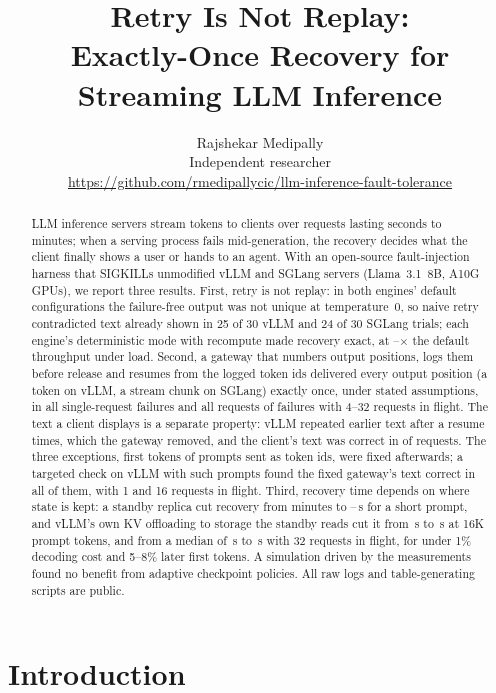 \documentclass[10pt,twocolumn]{article}
\title{Retry Is Not Replay:\\ Exactly-Once Recovery for Streaming LLM Inference}
\author{Rajshekar Medipally\\
\small Independent researcher\\
\small \url{https://github.com/rmedipallycic/llm-inference-fault-tolerance}}
\date{}
\begin{document}
\maketitle
\thispagestyle{fancy}


\begin{abstract}
LLM inference servers stream tokens to clients over requests lasting seconds
to minutes; when a serving process fails mid-generation, the recovery decides
what the client finally shows a user or hands to an agent. With an
open-source fault-injection harness that SIGKILLs unmodified vLLM and SGLang
servers (Llama~3.1~8B, A10G GPUs), we report three results. First, retry is
not replay: in both engines' default configurations the failure-free output
was not unique at temperature~0, so naive retry contradicted text already
shown in 25 of 30 vLLM and 24 of 30 SGLang trials; each engine's
deterministic mode with recompute made recovery exact, at
\TputDetMin--\TputDetMax$\times$ the default throughput under load. Second,
a gateway that numbers output positions, logs them before release and
resumes from the logged token ids delivered every output position (a token
on vLLM, a stream chunk on SGLang) exactly once, under stated assumptions, in all \GwKillTrials{} single-request failures
and all \PccRecords{} requests of failures with 4--32 requests in flight. The
text a client displays is a separate property: vLLM repeated earlier text
after a resume \RevRepeatRemoved{} times, which the gateway removed, and the
client's text was correct in \RevTextOk{} of \RevRecords{} requests. The three
exceptions, first tokens of prompts sent as token ids, were fixed afterwards;
a targeted check on vLLM with \TbPrompts{} such prompts found the fixed
gateway's text correct in all of them, with 1 and 16 requests in flight.
Third, recovery time
depends on where state is kept: a standby replica cut recovery from minutes
to \GwFailoverMin--\GwFailoverMax\,s for a short prompt, and vLLM's own KV
offloading to storage the standby reads cut it from \PfbSixteenNone\,s to
\PfbSixteenPrompt\,s at 16K prompt tokens, and from a median of
\PccThirtyTwoNone\,s to \PccThirtyTwoPrompt\,s with 32 requests in flight, for
under 1\% decoding cost and 5--8\% later first tokens. A simulation driven by
the measurements found no benefit from adaptive checkpoint policies. All raw
logs and table-generating scripts are public.
\end{abstract}

\section{Introduction}
\end{document}
